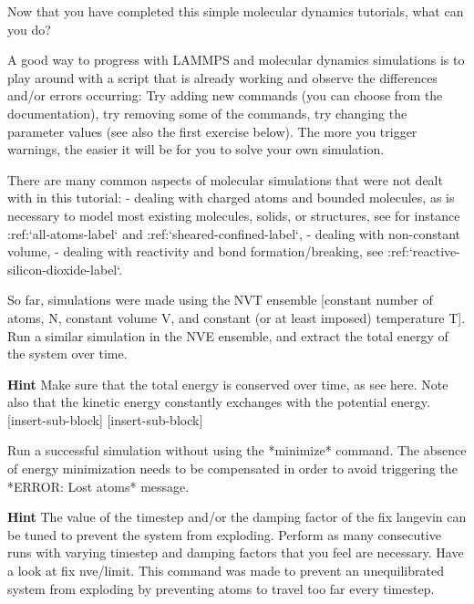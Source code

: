 Now that you have completed this simple molecular dynamics tutorials, what can you do?






A good way to progress with LAMMPS and molecular dynamics
simulations is to play around with a script that is already
working and observe the differences and/or errors occurring:
Try adding new commands (you can choose from the documentation),
try removing some of the commands, try changing the parameter values
(see also the first exercise below).
The more you trigger warnings, the easier it will be for you to solve your
own simulation.






There are many common aspects of molecular simulations that were not dealt with in this
tutorial:
- dealing with charged atoms and bounded molecules, as is necessary to model most existing molecules, solids, or structures, see for instance :ref:`all-atoms-label` and :ref:`sheared-confined-label`,
- dealing with non-constant volume,
- dealing with reactivity and bond formation/breaking, see :ref:`reactive-silicon-dioxide-label`.












So far, simulations were made using the NVT ensemble [constant number 
of atoms, N, constant volume V, and constant (or at least imposed)
temperature T].
Run a similar simulation in the NVE ensemble, and extract the
total energy of the system over time.


\textbf{Hint} Make sure that the total energy is conserved over time, as see here. Note also 
that the kinetic energy constantly exchanges with the potential energy.
[insert-sub-block]
[insert-sub-block]






Run a successful simulation without using the *minimize* command.
The absence of energy minimization needs to be compensated
in order to avoid triggering the *ERROR: Lost atoms* message.


\textbf{Hint} The value of the timestep and/or the damping factor of the fix langevin
can be tuned to prevent the system from exploding.
Perform as many consecutive runs with varying timestep and damping
factors that you feel are necessary.
Have a look at fix nve/limit. This command was
made to prevent an unequilibrated system from exploding
by preventing atoms to travel too far every timestep.






